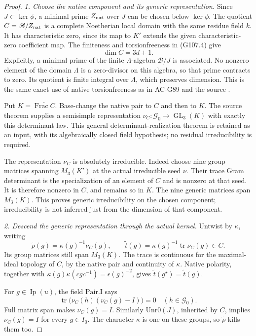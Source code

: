 \begin{proof}
\emph{1. Choose the native component and its generic representation.}
Since \(J\subset\ker\phi\), a minimal prime
\(Z_{\rm nat}\) over \(J\) can be chosen below
\(\ker\phi\).
The quotient \(C=\mathscr B/Z_{\rm nat}\) is a
complete Noetherian local domain with the same
residue field \(k\).
It has characteristic zero, since its map to \(K'\)
extends the given characteristic-zero coefficient map.
The finiteness and torsionfreeness in (G107.4) give
\[
                           \dim C=3d+1.
 \tag{G107.28}
\]
Explicitly, a minimal prime of the finite
\(\Lambda\)-algebra \(\mathscr B/J\) is associated.
No nonzero element of the domain \(\Lambda\) is a
zero-divisor on this algebra, so that prime contracts
to zero.  Its quotient is finite integral over
\(\Lambda\), which preserves dimension.
This is the same exact use of native torsionfreeness
as in AC-G89 and the source .

Put \(K=\overline{\operatorname{Frac}C}\).
Base-change the native pair to \(C\) and then to \(K\).
The source theorem
 supplies
a semisimple representation
\(\nu_C:\mathcal G_0\to\operatorname{GL}_3(K)\)
with exactly this determinant law.
This general determinant-realization theorem is
retained as an input, with its algebraically closed
field hypothesis; no residual irreducibility is required.

The representation \(\nu_C\) is absolutely irreducible.
Indeed choose nine group matrices spanning \(M_3(K')\)
at the actual irreducible seed \(\nu\).
Their trace Gram determinant is the specialization
of an element of \(C\) and is nonzero at that seed.
It is therefore nonzero in \(C\), and remains so in
\(K\).  The nine generic matrices span \(M_3(K)\).
This proves generic irreducibility on the chosen
component; irreducibility is not inferred just from
the dimension of that component.

\emph{2. Descend the generic representation through the actual kernel.}
Untwist by \(\kappa\), writing
\[
 \widetilde\rho(g)=\kappa(g)^{-1}\nu_C(g),\qquad
 \widetilde t(g)=\kappa(g)^{-1}\operatorname{tr}\nu_C(g)
                                  \in C.
 \tag{G107.29}
\]
Its group matrices still span \(M_3(K)\).
The trace is continuous for the maximal-ideal topology
of \(C\), by the native pair and continuity of \(\kappa\).
Native polarity, together with
\(\kappa(g)\kappa(cgc^{-1})=\epsilon(g)^{-2}\),
gives
\(\widetilde t(g^\star)=\widetilde t(g)\).

For \(g\in\operatorname{Ip}(u)\), the field
\(\mathrm{Pair.I}\) says
\[
        \operatorname{tr}\bigl(\nu_C(h)(\nu_C(g)-I)\bigr)=0
                           \quad(h\in\mathcal G_0).
 \tag{G107.30}
\]
Full matrix span makes \(\nu_C(g)=I\).
Similarly \(\mathrm{Unr0}(J)\), inherited by \(C\),
implies \(\nu_C(g)=I\) for every \(g\in I_0\).
The character \(\kappa\) is one on these groups,
so \(\widetilde\rho\) kills them too.


\end{proof}
